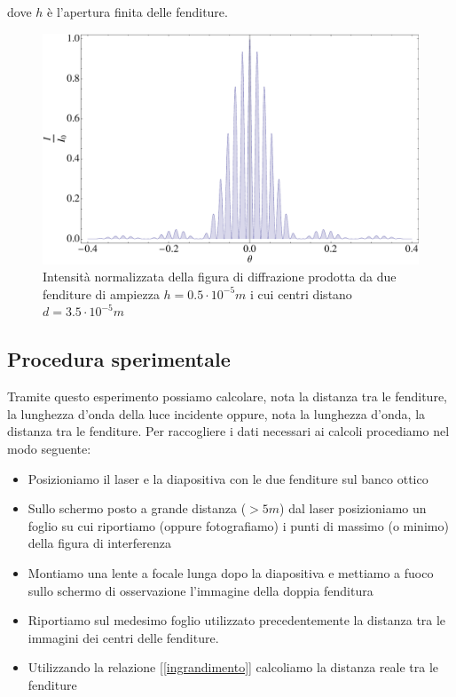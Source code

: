 \documentclass[a4paper,10pt,oneside]{article}
\begin{document}
dove $h$ è l'apertura finita delle fenditure.
\begin{figure}[H]
 \centering
 \includegraphics[width=\textwidth]{./Immagini/diffrazione.pdf}
 \caption{Intensità normalizzata della figura di diffrazione prodotta da due fenditure di ampiezza $h=0.5\cdot 10^{-5}m$ i cui centri distano $d=3.5\cdot 10^{-5}m$}
 \label{fig:int_duefenditure}
\end{figure}
\subsection*{Procedura sperimentale}
Tramite questo esperimento possiamo calcolare, nota la distanza tra le fenditure, la lunghezza d'onda della luce incidente oppure, nota la lunghezza d'onda, la distanza tra le fenditure.
Per raccogliere i dati necessari ai calcoli procediamo nel modo seguente:
\begin{itemize}
 \item Posizioniamo il laser  e la diapositiva con le due fenditure sul banco ottico
 \item Sullo schermo posto a grande distanza ($>5m$) dal laser posizioniamo un foglio su cui riportiamo (oppure fotografiamo) i punti di massimo (o minimo) della figura di interferenza
 \item Montiamo una lente a focale lunga dopo la diapositiva e mettiamo a fuoco sullo schermo di osservazione l'immagine della doppia fenditura
\item Riportiamo sul medesimo foglio utilizzato precedentemente la distanza tra le immagini dei centri delle fenditure.
\item Utilizzando la relazione [\ref{ingrandimento}] calcoliamo la distanza reale tra le fenditure
\end{itemize}
\end{document}
